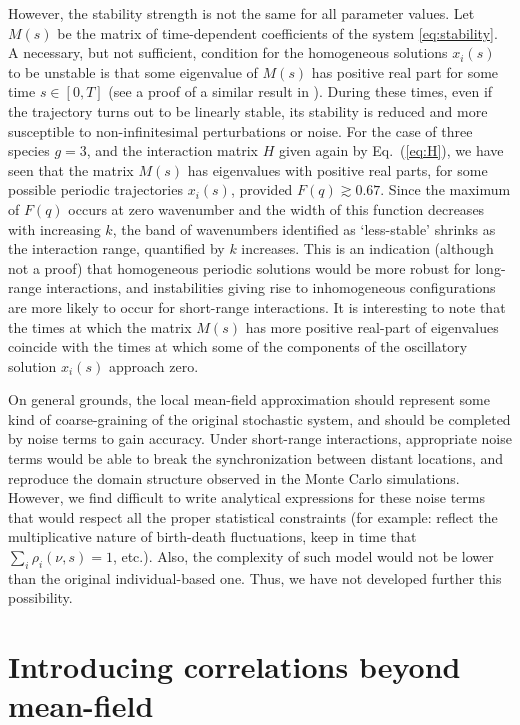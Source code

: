However, the stability strength is not the same for all
parameter values. Let $M(s)$ be the matrix of time-dependent
coefficients of the system \eqref{eq:stability}. A necessary,
but not sufficient, condition for the homogeneous solutions
$x_i(s)$ to be unstable is that some eigenvalue of $M(s)$ has
positive real part for some time $s\in[0,T]$  (see a proof of a
similar result in \cite{klkh20}). During these times, even if
the trajectory turns out to be linearly stable, its stability
is reduced and more susceptible to non-infinitesimal
perturbations or noise. For the case of three species $g=3$,
and the interaction matrix $H$ given again by Eq.~(\ref{eq:H}), we have seen
that the matrix $M(s)$ has eigenvalues with positive real
parts, for some possible periodic trajectories $x_i(s)$,
provided $F(q) \gtrsim 0.67$. Since the maximum of $F(q)$
occurs at zero wavenumber and the width of this function
decreases with increasing $k$, the band of wavenumbers
identified as `less-stable' shrinks as the interaction range,
quantified by $k$ increases. This is an indication (although
not a proof) that homogeneous periodic solutions would be more
robust for long-range interactions, and instabilities giving
rise to inhomogeneous configurations are more likely to occur
for short-range interactions. It is interesting to note that the
times at which the matrix $M(s)$ has more positive real-part of
eigenvalues coincide with the times at which some of the
components of the oscillatory solution $x_i(s)$ approach zero.


On general grounds, the local mean-field approximation should
represent some kind of coarse-graining of the original
stochastic system, and should be completed by noise terms to
gain accuracy. Under short-range interactions, appropriate
noise terms would be able to break the synchronization between
distant locations, and reproduce the domain structure
observed in the Monte Carlo simulations. However, we find
difficult to write analytical expressions for these noise terms
that would respect all the proper statistical constraints (for
example: reflect the multiplicative nature of birth-death
fluctuations, keep in time that $\sum_i \rho_i(\nu,s)=1$,
etc.). Also, the complexity of such model would not be lower
than the original individual-based one. Thus, we have not
developed further this possibility. 


\section{\label{sec:app_toymodel} Introducing correlations 
beyond mean-field}

